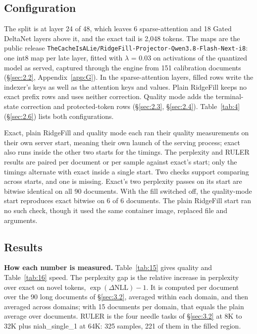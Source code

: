 \documentclass[11pt]{article}
\begin{document}
\subsection{Configuration}\label{sec:5.2}
The split is at layer 24 of 48, which leaves 6 sparse-attention and 18 Gated DeltaNet layers above it, and the exact tail is 2,048 tokens. The maps are the public release \texttt{TheCacheIsALie/\allowbreak{}RidgeFill-\allowbreak{}Projector-\allowbreak{}Qwen3.\allowbreak{}8-\allowbreak{}Flash-\allowbreak{}Next-\allowbreak{}i8}: one int8 map per late layer, fitted with $\lambda$ = 0.03 on activations of the quantized model as served, captured through the engine from 151 calibration documents (\S\ref{sec:2.2}, Appendix~\ref{app:G}). In the sparse-attention layers, filled rows write the indexer's keys as well as the attention keys and values. Plain RidgeFill keeps no exact prefix rows and uses neither correction. Quality mode adds the terminal-state correction and protected-token rows (\S\ref{sec:2.3}, \S\ref{sec:2.4}). Table~\ref{tab:4} (\S\ref{sec:2.6}) lists both configurations.

Exact, plain RidgeFill and quality mode each ran their quality measurements on their own server start, meaning their own launch of the serving process; exact also runs inside the other two starts for the timings. The perplexity and RULER results are paired per document or per sample against exact's start; only the timings alternate with exact inside a single start. Two checks support comparing across starts, and one is missing. Exact's two perplexity passes on its start are bitwise identical on all 90 documents. With the fill switched off, the quality-mode start reproduces exact bitwise on 6 of 6 documents. The plain RidgeFill start ran no such check, though it used the same container image, replaced file and arguments.


\subsection{Results}\label{sec:5.3}
\textbf{How each number is measured.} Table~\ref{tab:15} gives quality and Table~\ref{tab:16} speed. The perplexity gap is the relative increase in perplexity over exact on novel tokens, $\exp(\Delta\mathrm{NLL}) - 1$. It is computed per document over the 90 long documents of \S\ref{sec:3.2}, averaged within each domain, and then averaged across domains; with 15 documents per domain, that equals the plain average over documents. RULER is the four needle tasks of \S\ref{sec:3.2} at 8K to 32K plus niah\_single\_1 at 64K: 325 samples, 221 of them in the filled region.
\end{document}

